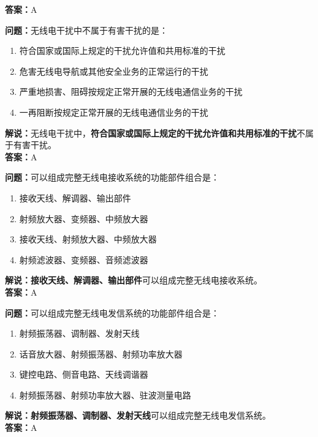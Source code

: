 \textbf{答案：}A

\textbf{问题：}无线电干扰中不属于有害干扰的是：

\begin{enumerate}[label=\Alph*), leftmargin=1cm]
	\item 符合国家或国际上规定的干扰允许值和共用标准的干扰
	\item 危害无线电导航或其他安全业务的正常运行的干扰
	\item 严重地损害、阻碍按规定正常开展的无线电通信业务的干扰
	\item 一再阻断按规定正常开展的无线电通信业务的干扰
\end{enumerate}

\textbf{解说：}无线电干扰中，\textbf{符合国家或国际上规定的干扰允许值和共用标准的干扰}不属于有害干扰。\\\textbf{答案：}A%



\textbf{问题：}可以组成完整无线电接收系统的功能部件组合是：

\begin{enumerate}[label=\Alph*), leftmargin=1cm]
	\item 接收天线、解调器、输出部件
	\item 射频放大器、变频器、中频放大器
	\item 接收天线、射频放大器、中频放大器
	\item 射频滤波器、变频器、音频滤波器
\end{enumerate}

\textbf{解说：}\textbf{接收天线、解调器、输出部件}可以组成完整无线电接收系统。\\\textbf{答案：}A%



\textbf{问题：}可以组成完整无线电发信系统的功能部件组合是：

\begin{enumerate}[label=\Alph*), leftmargin=1cm]
	\item 射频振荡器、调制器、发射天线
	\item 话音放大器、射频振荡器、射频功率放大器
	\item 键控电路、侧音电路、天线调谐器
	\item 射频振荡器、射频功率放大器、驻波测量电路
\end{enumerate}

\textbf{解说：}\textbf{射频振荡器、调制器、发射天线}可以组成完整无线电发信系统。\\\textbf{答案：}A%



